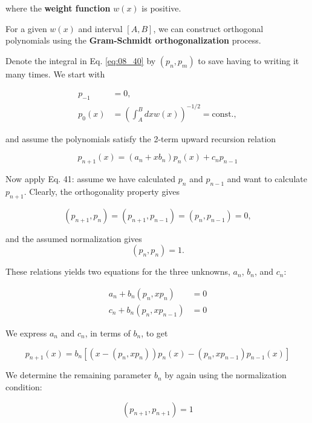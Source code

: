 where the \textbf{weight function} $w(x)$ is positive.

For a given $w(x)$ and interval $[A,B]$, we can construct orthogonal polynomials using the \textbf{Gram-Schmidt orthogonalization} process.

Denote the integral in Eq. \ref{eq:08_40} by $(p_{n}, p_{m})$ to save having to writing it many times. We start with


  \begin{align*}
p_{-1} & = 0, \\
p_{0}(x) & = (\int_{A}^{B}dx w(x))^{-1/2} = \text{const.} ,
  \end{align*}

and assume the polynomials satisfy the 2-term upward recursion relation

\begin{equation}
p_{n+1}(x) = (a_{n} + xb_{n} ) p_{n}(x) + c_{n}p_{n-1}
\end{equation}

Now apply Eq. 41: assume we have calculated $p_{n}$ and $p_{n-1}$ and want to calculate $p_{n+1}$. Clearly, the orthogonality property gives

\begin{equation*}
(p_{n+1},p_{n}) = (p_{n+1},p_{n-1}) = (p_{n},p_{n-1}) = 0,
\end{equation*}

and the assumed normalization gives
\begin{equation*}
(p_{n},p_{n}) = 1.
\end{equation*}

These relations yields two equations for the three unknowns, $a_{n}$, $b_{n}$, and $c_{n}$:

\begin{align*}
a_{n} + b_{n} (p_n, xp_{n})   & = 0 \\
c_{n} + b_{n} (p_n, xp_{n-1}) & = 0
\end{align*}

We express $a_{n}$ and $c_{n}$, in terms of $b_{n}$, to get

\begin{equation}
p_{n+1}(x) = b_{n} \left[ (x - (p_{n}, xp_{n})) p_{n}(x) - (p_{n} , x p_{n-1})p_{n-1}(x) \right]
\end{equation}

We determine the remaining parameter $b_{n}$ by again using the normalization condition:

\begin{equation*}
(p_{n+1} , p_{n+1}) = 1
\end{equation*}

